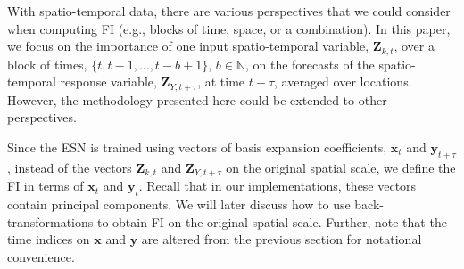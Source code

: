 \documentclass[AMS,STIX2COL]{WileyNJD-v2}
\begin{document}
With spatio-temporal data, there are various perspectives that we could consider when computing FI (e.g., blocks of time, space, or a combination). In this paper, we focus on the importance of one input spatio-temporal variable, $\textbf{Z}_{k,t}$, over a block of times, $\{t,t-1,...,t-b+1\}$, $b\in\mathbb{N}$, on the forecasts of the spatio-temporal response variable, ${\textbf{Z}}_{Y,t+\tau}$, at time $t+\tau$, averaged over locations. However, the methodology presented here could be extended to other perspectives.

Since the ESN is trained using vectors of basis expansion coefficients, $\textbf{x}_t$ and $\textbf{y}_{t+\tau}$, instead of the vectors $\textbf{Z}_{k,t}$ and $\textbf{Z}_{Y,t+\tau}$ on the original spatial scale, we define the FI in terms of $\textbf{x}_{t}$ and $\textbf{y}_{t}$. Recall that in our implementations, these vectors contain principal components. We will later discuss how to use back-transformations to obtain FI on the original spatial scale. Further, note that the time indices on $\textbf{x}$ and $\textbf{y}$ are altered from the previous section for notational convenience.
\end{document}
